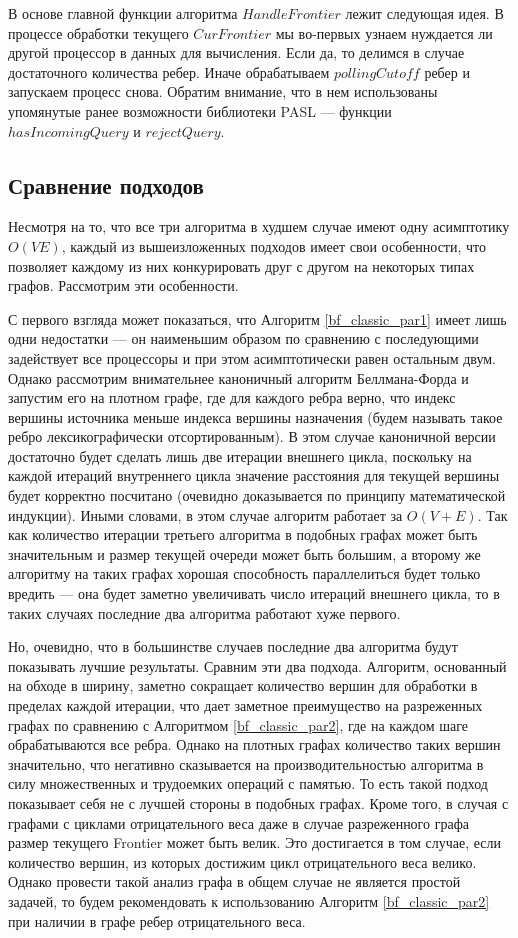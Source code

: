 В основе главной функции алгоритма $HandleFrontier$ лежит следующая идея. В процессе обработки текущего $CurFrontier$ мы во-первых узнаем нуждается ли другой процессор в данных для вычисления. Если да, то делимся в случае достаточного количества ребер. Иначе обрабатываем $pollingCutoff$ ребер и запускаем процесс снова. Обратим внимание, что в нем использованы упомянутые ранее возможности библиотеки PASL --- функции $hasIncomingQuery$ и $rejectQuery$. 

\FloatBarrier
\subsection{Сравнение подходов}
Несмотря на то, что все три алгоритма в худшем случае имеют одну асимптотику  $O(VE)$, каждый из вышеизложенных подходов имеет свои особенности, что позволяет каждому из них конкурировать друг с другом на некоторых типах графов. Рассмотрим эти особенности.

С первого взгляда может показаться, что Алгоритм \ref{bf_classic_par1} имеет лишь одни недостатки --- он наименьшим образом по сравнению с последующими задействует все процессоры и при этом асимптотически равен остальным двум. Однако рассмотрим внимательнее каноничный алгоритм Беллмана-Форда и запустим его на плотном графе, где для каждого ребра верно, что индекс вершины источника меньше индекса вершины назначения (будем называть такое ребро лексикографически отсортированным). В этом случае каноничной версии достаточно будет сделать лишь две итерации внешнего цикла, поскольку на каждой итераций внутреннего цикла значение расстояния для текущей вершины будет корректно посчитано (очевидно доказывается по принципу математической индукции). Иными словами, в этом случае алгоритм работает за $O(V + E)$. Так как количество итерации третьего алгоритма в подобных графах может быть значительным и размер текущей очереди может быть большим, а второму же алгоритму на таких графах хорошая способность параллелиться будет только вредить --- она будет заметно увеличивать число итераций внешнего цикла, то в таких случаях последние два алгоритма работают хуже первого.   

Но, очевидно, что в большинстве случаев последние два алгоритма будут показывать лучшие результаты. Сравним эти два подхода. Алгоритм, основанный на обходе в ширину, заметно сокращает количество вершин для обработки в пределах каждой итерации, что дает заметное преимущество на разреженных графах по сравнению с Алгоритмом \ref{bf_classic_par2}, где на каждом шаге обрабатываются все ребра. Однако на плотных графах количество таких вершин значительно, что негативно сказывается на производительностью алгоритма в силу множественных и трудоемких операций с памятью. То есть такой подход показывает себя не с лучшей стороны в подобных графах. Кроме того, в случая с графами с циклами отрицательного веса даже в случае разреженного графа размер текущего Frontier может быть велик. Это достигается в том случае, если количество вершин, из которых достижим цикл отрицательного веса велико. Однако провести такой анализ графа в общем случае не является простой задачей, то будем рекомендовать к использованию Алгоритм \ref{bf_classic_par2} при наличии в графе ребер отрицательного веса.

